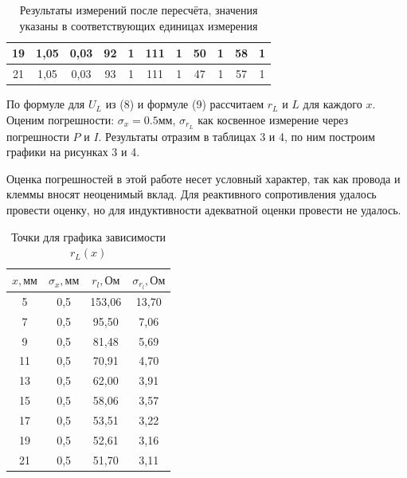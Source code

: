 \documentclass[a4paper, fontsize = 14pt]{article}
\begin{document}
\begin{table}[hbt]
{\begin{tabular}{|c|c|c|c|c|c|c|c|c|c|c|}
19               & 1,05              & 0,03                   & 92                & 1                          & 111                   & 1                              & 50                  & 1                          & 58                 & 1                           \\ \hline
21               & 1,05              & 0,03                   & 93                & 1                          & 111                   & 1                              & 47                  & 1                          & 57                 & 1                           \\ \hline
\end{tabular}
}
\caption{Результаты измерений после пересчёта, значения указаны в соответствующих единицах измерения}
\end{table}

По формуле для $U_L$ из (8) и формуле (9) рассчитаем $r_L$ и $L$ для каждого $x$.  Оценим погрешности: $\sigma_x = 0.5 мм$, $\sigma_{r_L}$ как косвенное измерение через погрешности $P$ и $I$. Результаты отразим в таблицах 3 и 4, по ним построим графики на рисунках 3 и 4.

Оценка погрешностей в этой работе несет условный характер, так как провода и клеммы вносят неоценимый вклад. Для реактивного сопротивления удалось провести оценку, но для индуктивности адекватной оценки провести не удалось.

\begin{table}[hbt]
\centering
\begin{tabular}{|c|c|c|c|}
\hline
\textbf{$x, мм$} & \textbf{$\sigma_x, мм$} & \textbf{$r_l, Ом$} & \textbf{$\sigma_{r_l}, Ом$} \\ \hline
5                & 0,5                     & 153,06             & 13,70                       \\ \hline
7                & 0,5                     & 95,50              & 7,06                        \\ \hline
9                & 0,5                     & 81,48              & 5,69                        \\ \hline
11               & 0,5                     & 70,91              & 4,70                        \\ \hline
13               & 0,5                     & 62,00              & 3,91                        \\ \hline
15               & 0,5                     & 58,06              & 3,57                        \\ \hline
17               & 0,5                     & 53,51              & 3,22                        \\ \hline
19               & 0,5                     & 52,61              & 3,16                        \\ \hline
21               & 0,5                     & 51,70              & 3,11                        \\ \hline
\end{tabular}
\caption{Точки для графика зависимости $r_L(x)$}
\end{table}
\end{document}
